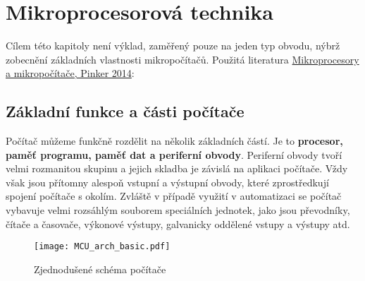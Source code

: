 \chapter{Mikroprocesorová technika}\label{ces:IchapIV}
\minitoc

  Cílem této kapitoly není výklad, zaměřený pouze na jeden typ obvodu, nýbrž zobecnění základních 
  vlastnosti mikropočítačů. Použitá literatura 
  \href{http://librarian/stable.php?id=145}{Mikroprocesory a mikropočítače, Pinker 2014}: 
  \cite{Pinker2004}
  
  \section{Základní funkce a části počítače}\label{ces:IchapIVsecI}
    Počítač můžeme funkčně rozdělit na několik základních částí. Je to \textbf{procesor, paměť 
    programu, paměť dat a periferní obvody}. Periferní obvody tvoří velmi rozmanitou skupinu a 
    jejich skladba je závislá na aplikaci počítače. Vždy však jsou přítomny alespoň vstupní a 
    výstupní obvody, které zprostředkují spojení počítače s okolím. Zvláště v případě využití v 
    automatizaci se počítač vybavuje velmi rozsáhlým souborem speciálních jednotek, jako jsou 
    převodníky, čítače a časovače, výkonové výstupy, galvanicky oddělené vstupy a výstupy atd.
    
    \begin{figure}[ht!]   %
      \centering
      \texttt{[image: MCU\_arch\_basic.pdf]}
      \caption{Zjednodušené schéma počítače}
      \label{MIT:fig_pocitac01}
    \end{figure}

